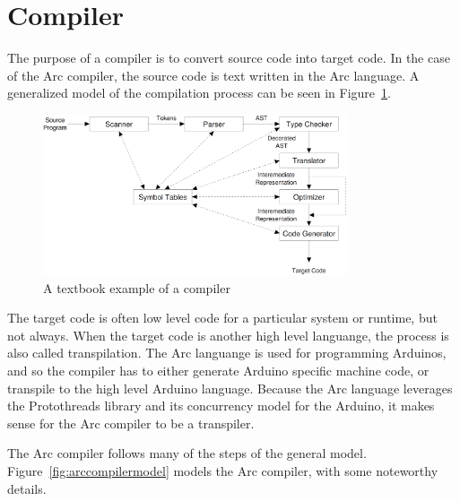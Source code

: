 \section{Compiler}\label{sec:compiler}

The purpose of a compiler is to convert source code into target code. In the case of the Arc compiler, the source code is text written in the Arc language. A generalized model of the compilation process can be seen in Figure~\ref{fig:generalcompilermodel}.

\begin{figure}[htb!]
    \centering
    \includegraphics[width=0.8\textwidth]{figures/Full_Compiler.png}
    \caption{A textbook example of a compiler~\cite{CraftingCompiler}}
    \label{fig:generalcompilermodel}
\end{figure}

The target code is often low level code for a particular system or runtime, but not always. When the target code is another high level languange, the process is also called transpilation. The Arc languange is used for programming Arduinos, and so the compiler has to either generate Arduino specific machine code, or transpile to the high level Arduino language. Because the Arc language leverages the Protothreads library and its concurrency model for the Arduino, it makes sense for the Arc compiler to be a transpiler.

The Arc compiler follows many of the steps of the general model. Figure~\ref{fig:arccompilermodel} models the Arc compiler, with some noteworthy details.

